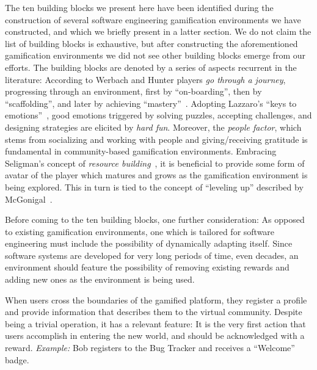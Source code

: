 The ten building blocks we present here have been identified during the construction of several software engineering gamification environments we have constructed, and which we briefly present in a latter section.
We do not claim the list of building blocks is exhaustive, but after constructing the aforementioned gamification environments we did not see other building blocks emerge from our efforts.
The building blocks are denoted by a series of aspects recurrent in the literature: According to Werbach and Hunter players {\em go through a journey}, progressing through an environment, first by ``on-boarding'', then by ``scaffolding'', and later by achieving ``mastery''~\cite{Werb2012a}.
Adopting Lazzaro's ``keys to emotions''~\cite{Lazzaro2004}, good emotions triggered by solving puzzles, accepting challenges, and designing strategies are elicited by {\em hard fun}.
Moreover, the {\em people factor}, which stems from socializing and working with people and giving/receiving gratitude is fundamental in community-based gamification environments.
Embracing Seligman's concept of {\em resource building}~\cite{seligman2000positive}, it is beneficial to provide some form of avatar of the player which matures and grows as the gamification environment is being explored.
This in turn is tied to the concept of ``leveling up'' described by McGonigal~\cite{McGo2011a}.

Before coming to the ten building blocks, one further consideration: As opposed to existing gamification environments, one which is tailored for software engineering must include the possibility of dynamically adapting itself.
Since software systems are developed for very long periods of time, even decades, an environment should feature the possibility of removing existing rewards and adding new ones as the environment is being used.

 When users cross the boundaries of the gamified platform, they register a profile and provide information that describes them to the virtual community.
Despite being a trivial operation, it has a relevant feature: It is the very first action that users accomplish in entering the new world, and should be acknowledged with a reward.
{\em Example:} Bob registers to the Bug Tracker and receives a ``Welcome'' badge.

